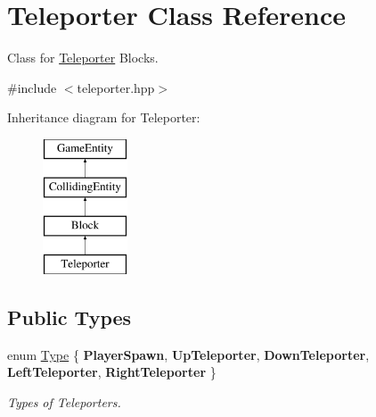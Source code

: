 \hypertarget{class_teleporter}{}\section{Teleporter Class Reference}
\label{class_teleporter}


Class for \mbox{\hyperlink{class_teleporter}{Teleporter}} Blocks.  




{\ttfamily \#include $<$teleporter.\+hpp$>$}

Inheritance diagram for Teleporter\+:\begin{figure}[H]
\begin{center}
\leavevmode
\includegraphics[height=4.000000cm]{class_teleporter}
\end{center}
\end{figure}
\subsection*{Public Types}
\begin{DoxyCompactItemize}
\item 
\mbox{\label{class_teleporter_ac08612ae4bbae27cfe956ee7641fde80}} 
enum \mbox{\hyperlink{class_teleporter_ac08612ae4bbae27cfe956ee7641fde80}{Type}} \{ \newline
{\bfseries Player\+Spawn}, 
{\bfseries Up\+Teleporter}, 
{\bfseries Down\+Teleporter}, 
{\bfseries Left\+Teleporter}, 
\newline
{\bfseries Right\+Teleporter}
 \}
\begin{DoxyCompactList}\small\item\em Types of Teleporters. \end{DoxyCompactList}\end{DoxyCompactItemize}
